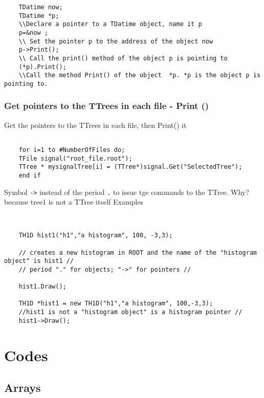 \documentclass[12pt]{article}
\begin{document}
\begin{itemize}
	\begin{verbatim}
	TDatime now;
	TDatime *p;
	\\Declare a pointer to a TDatime object, name it p
	p=&now ;
	\\ Set the pointer p to the address of the object now
	p->Print();
	\\ Call the print() method of the object p is pointing to
	(*p).Print();
	\\Call the method Print() of the object  *p. *p is the object p is pointing to.
	\end{verbatim}

	\subsection{Get pointers to the TTrees in each file - Print ()}
	Get the pointers to the TTrees in each file, then Print() it

	\begin{verbatim}

	for i=1 to #NumberOfFiles do;
	TFile signal("root_file.root");
	TTree * mysignalTree[i] = (TTree*)signal.Get("SelectedTree");
	end if

	\end{verbatim}




	Symbol \verb|->| instead of the period \verb|.| to issue tge commands to the TTree.
	Why? because tree1 is not a TTree itself
	Examples


	\begin{verbatim}


	TH1D hist1("h1","a histogram", 100, -3,3);

	// creates a new histogram in ROOT and the name of the "histogram object" is hist1 //
	// period "." for objects; "->" for pointers //

	hist1.Draw();

	TH1D *hist1 = new TH1D("h1","a histogram", 100,-3,3);
	//hist1 is not a "histogram object" is a histogram pointer //
	hist1->Draw();

	\end{verbatim}

\chapter{Codes}

\section{Arrays}
\label{pointers.codes}


\end{itemize}
\end{document}
